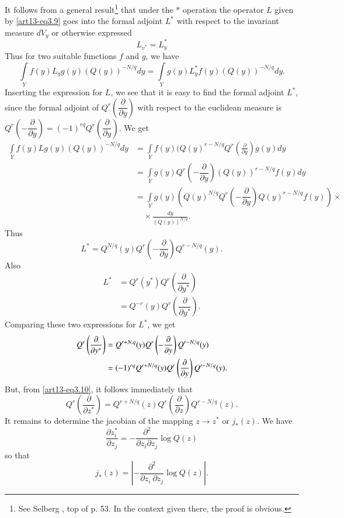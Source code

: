It follows from a general result\footnote[11]{See Selberg \cite{art13-key3}, top of p. 53. In the context given there, the proof is obvious.} that under the $*$ operation the operator $L$ given by \eqref{art13-eq3.9} goes into the formal adjoint $L^{*}$ with respect to the invariant measure $dV_{y}$ or otherwise expressed
$$
L_{v^{*}}=L^{*}_{y}
$$
Thus for two suitable functions $f$ and $g$, we have
$$
\int\limits_{Y}f(y)L_{y}g(y)(Q(y))^{-N/q}dy=\int\limits_{Y}g(y)L^{*}_{y}f(y)(Q(y))^{-N/q}dy.
$$
Inserting the expression for $L$, we see that it is easy to find the formal adjoint $L^{*}$, since the formal adjoint of $Q^{r}\left(\dfrac{\partial}{\partial y}\right)$ with respect to the euclidean measure is $Q^{r}\left(-\dfrac{\partial}{\partial y}\right)=(-1)^{rq}Q^{r}\left(\dfrac{\partial}{\partial y}\right)$. We get
\begin{align*}
\int\limits_{Y}f(y)Lg(y)(Q(y))^{-N/q}dy &= \int\limits_{Y}f(y)(Q(y)^{r-N/q}Q^{r}\left(\frac{\partial}{\partial y}\right)g(y)dy\\[3pt]
&= \int\limits_{Y}g(y)Q^{r}\left(-\dfrac{\partial}{\partial y}\right)(Q(y))^{r-N/q}f(y)dy\\[3pt]
&= \int\limits_{Y}g(y)\left(Q(y)^{N/q}Q^{r}\left(-\dfrac{\partial}{\partial y}\right)Q(y)^{r-N/q}f(y)\right)\times{}\\
&\quad \times \frac{dy}{(Q(y))^{N/q}}.
\end{align*}
Thus
$$
L^{*}=Q^{N/q}(y)Q^{r}\left(-\dfrac{\partial}{\partial y}\right)Q^{r-N/q}(y).
$$
Also\pageoriginale
\begin{align*}
L^{*} &= Q^{r}(y^{*})Q^{r}\left(\dfrac{\partial}{\partial y^{*}}\right)\\
&= Q^{-r}(y)Q^{r}\left(\dfrac{\partial}{\partial y^{*}}\right).
\end{align*}
Comparing these two expressions for $L^{*}$, we get
\begin{align}
Q^{r}\left(\frac{\partial}{\partial y^{*}}\right) &= Q^{r+N.q}(y)Q^{r}\left(-\dfrac{\partial}{\partial y}\right)Q^{r-N/q}(y)\label{art13-eq3.10}\\
&= (-1)^{rq}Q^{r+N/q}(y)Q^{r}\left(\dfrac{\partial}{\partial y}\right)Q^{r-N/q}(y).\notag
\end{align}
But, from \eqref{art13-eq3.10}, it follows immediately that
\begin{equation}
Q^{r}\left(\dfrac{\partial}{\partial z^{*}}\right)=Q^{r+N/q}(z)Q^{r}\left(\dfrac{\partial}{\partial z}\right)Q^{r-N/q}(z).\label{art13-eq3.11}
\end{equation}
It remains to determine the jacobian of the mapping $z\to z^{*}$ or $j_{*}(z)$. We have
$$
\frac{\partial z^{*}_{i}}{\partial z_{j}}=-\frac{\partial^{2}}{\partial z_{i}\partial z_{j}}\log Q(z)
$$
so that
$$
j_{*}(z)=\left|-\frac{\partial^{2}}{\partial z_{i} \ \partial z_{j}}\log Q(z)\right|.
$$

